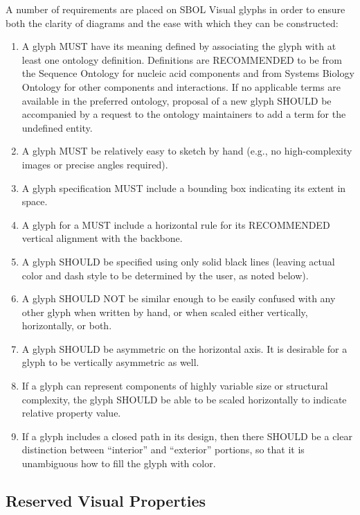 A number of requirements are placed on SBOL Visual glyphs in order to
ensure both the clarity of diagrams and the ease with which they can
be constructed:
\begin{enumerate}
\item A glyph MUST have its meaning defined by associating the glyph with at least one ontology definition.  
	Definitions are RECOMMENDED to be from the Sequence Ontology for nucleic acid components and from Systems Biology Ontology for other components and interactions.  
	If no applicable terms are available in the preferred ontology, proposal of a new glyph SHOULD be accompanied by a request to the ontology maintainers to add a term for the undefined entity.  
\item A glyph MUST be relatively easy to sketch by hand (e.g., no high-complexity images or precise angles required).
\item A glyph specification MUST include a bounding box indicating its extent in space.
\item A glyph for a  MUST include a horizontal rule for its RECOMMENDED vertical alignment with the  backbone.
\item A glyph SHOULD be specified using only solid black lines (leaving actual color and dash style to be determined by the user, as noted below).
\item A glyph SHOULD NOT be similar enough to be easily confused with
  any other glyph when written by hand, or when scaled either
  vertically, horizontally, or both.
\item A glyph SHOULD be asymmetric on the horizontal axis. It is desirable for a glyph to be vertically asymmetric as well.
\item If a glyph can represent components of highly variable size or structural complexity,
  the glyph SHOULD be able to be scaled horizontally to indicate relative property value.
\item If a glyph includes a closed path in its design, then there
  SHOULD be a clear distinction between ``interior'' and ``exterior''
  portions, so that it is unambiguous how to fill the glyph with color.
\end{enumerate}


\subsection{Reserved Visual Properties}

